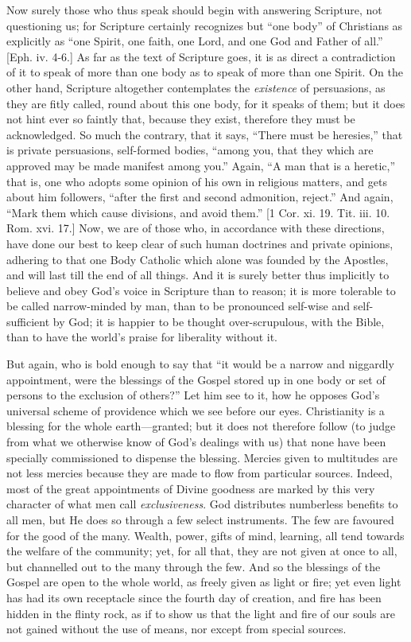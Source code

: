 Now surely those who thus speak should begin with answering
Scripture, not questioning us; for Scripture certainly recognizes but
``one body'' of Christians as explicitly as ``one Spirit,
one faith, one Lord, and one God and Father of all.'' [Eph. iv.
4-6.] As far as the text of Scripture goes, it is as direct a
contradiction of it to speak of more than one body as to speak of more
than one Spirit. On the other hand, Scripture altogether contemplates
the \emph{existence} of persuasions, as they are fitly called, round
about this one body, for it speaks of them; but it does not hint ever
so faintly that, because they exist, therefore they must be
acknowledged. So much the contrary, that it says, ``There must be
heresies,'' that is private persuasions, self-formed bodies,
``among you, that they which are approved may be made manifest
among you.'' Again, ``A man that is a heretic,'' that is,
one who adopts some opinion of his own in religious matters, and gets
about him followers, ``after the first and second admonition,
reject.'' And again, ``Mark them which cause divisions, and
avoid them.'' [1 Cor. xi. 19. Tit. iii. 10. Rom. xvi. 17.] Now, we
are of those who, in accordance with these directions, have done our
best to keep clear of such human doctrines and private opinions,
adhering to that one Body Catholic which alone was founded by the
Apostles, and will last till the end of all things. And it is surely
better thus implicitly to believe and obey God's voice in Scripture
than to reason; it is more tolerable to be called narrow-minded by
man, than to be pronounced self-wise and self-sufficient by God; it is
happier to be thought over-scrupulous, with the Bible, than to have
the world's praise for liberality without it.

But again, who is bold enough to say that ``it would be a
narrow and niggardly appointment, were the blessings of the Gospel
stored up in one body or set of persons to the exclusion of
others?'' Let him see to it, how he opposes God's universal
scheme of providence which we see before our eyes. Christianity is a
blessing for the whole earth—granted; but it does not therefore
follow (to judge from what we otherwise know of God's dealings with
us) that none have been specially commissioned to dispense the
blessing. Mercies given to multitudes are not less mercies because
they are made to flow from particular sources. Indeed, most of the
great appointments of Divine goodness are marked by this very
character of what men call \emph{exclusiveness}. God distributes
numberless benefits to all men, but He does so through a few select
instruments. The few are favoured for the good of the many. Wealth,
power, gifts of mind, learning, all tend towards the welfare of the
community; yet, for all that, they are not given at once to all, but
channelled out to the many through the few. And so the blessings of
the Gospel are open to the whole world, as freely given as light or
fire; yet even light has had its own receptacle since the fourth day
of creation, and fire has been hidden in the flinty rock, as if to
show us that the light and fire of our souls are not gained without
the use of means, nor except from special sources.

